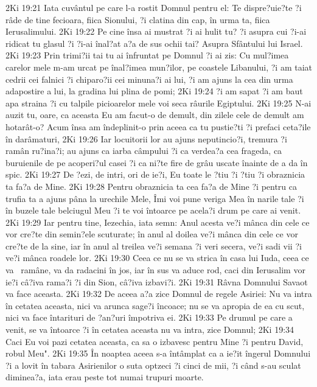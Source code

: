 2Ki 19:21  Iata cuvântul pe care l-a rostit Domnul pentru el: Te dispre?uie?te ?i râde de tine fecioara, fiica Sionului, ?i clatina din cap, în urma ta, fiica Ierusalimului.
2Ki 19:22  Pe cine însa ai mustrat ?i ai hulit tu? ?i asupra cui ?i-ai ridicat tu glasul ?i ?i-ai înal?at a?a de sus ochii tai? Asupra Sfântului lui Israel.
2Ki 19:23  Prin trimi?ii tai tu ai înfruntat pe Domnul ?i ai zis: Cu mul?imea carelor mele m-am urcat pe înal?imea mun?ilor, pe coastele Libanului, ?i am taiat cedrii cei falnici ?i chiparo?ii cei minuna?i ai lui, ?i am ajuns la cea din urma adapostire a lui, la gradina lui plina de pomi;
2Ki 19:24  ?i am sapat ?i am baut apa straina ?i cu talpile picioarelor mele voi seca râurile Egiptului.
2Ki 19:25  N-ai auzit tu, oare, ca aceasta Eu am facut-o de demult, din zilele cele de demult am hotarât-o? Acum însa am îndeplinit-o prin aceea ca tu pustie?ti ?i prefaci ceta?ile în darâmaturi,
2Ki 19:26  Iar locuitorii lor au ajuns neputincio?i, tremura ?i ramân ru?ina?i; au ajuns ca iarba câmpului ?i ca verdea?a cea frageda, ca buruienile de pe acoperi?ul casei ?i ca ni?te fire de grâu uscate înainte de a da în spic.
2Ki 19:27  De ?ezi, de intri, ori de ie?i, Eu toate le ?tiu ?i ?tiu ?i obraznicia ta fa?a de Mine.
2Ki 19:28  Pentru obraznicia ta cea fa?a de Mine ?i pentru ca trufia ta a ajuns pâna la urechile Mele, Îmi voi pune veriga Mea în narile tale ?i în buzele tale belciugul Meu ?i te voi întoarce pe acela?i drum pe care ai venit.
2Ki 19:29  Iar pentru tine, Iezechia, iata semn: Anul acesta ve?i mânca din cele ce vor cre?te din semin?ele scuturate; în anul al doilea ve?i mânca din cele ce vor cre?te de la sine, iar în anul al treilea ve?i semana ?i veri secera, ve?i sadi vii ?i ve?i mânca roadele lor.
2Ki 19:30  Ceea ce nu se va strica în casa lui Iuda, ceea ce va  ramâne, va da radacini în jos, iar în sus va aduce rod, caci din Ierusalim vor ie?i câ?iva rama?i ?i din Sion, câ?iva izbavi?i.
2Ki 19:31  Râvna Domnului Savaot va face aceasta.
2Ki 19:32  De aceea a?a zice Domnul de regele Asiriei: Nu va intra în cetatea aceasta, nici va arunca sage?i încoace; nu se va apropia de ea cu scut, nici va face întarituri de ?an?uri împotriva ei.
2Ki 19:33  Pe drumul pe care a venit, se va întoarce ?i în cetatea aceasta nu va intra, zice Domnul;
2Ki 19:34  Caci Eu voi pazi cetatea aceasta, ca sa o izbavesc pentru Mine ?i pentru David, robul Meu".
2Ki 19:35  În noaptea aceea s-a întâmplat ca a ie?it îngerul Domnului ?i a lovit în tabara Asirienilor o suta optzeci ?i cinci de mii, ?i când s-au sculat diminea?a, iata erau peste tot numai trupuri moarte.
